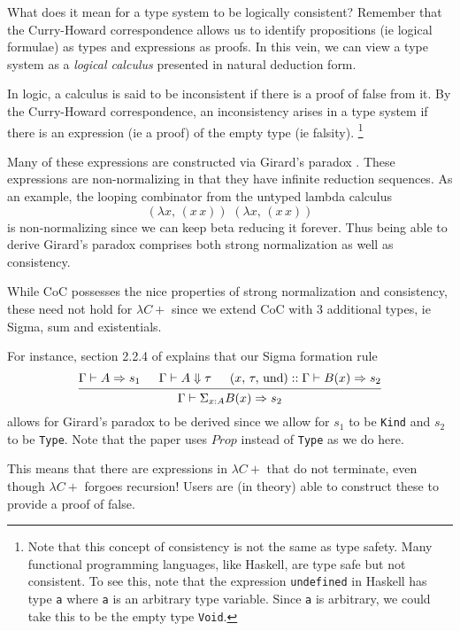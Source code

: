 \documentclass{article}
\begin{document}
What does it mean for a type system to be logically consistent? Remember
that the Curry-Howard correspondence allows us to identify propositions
(ie logical formulae) as types and expressions as proofs.
In this vein, we can view a type system as a \textit{logical calculus}
presented in natural deduction form.

In logic, a calculus is said to be inconsistent if there is a proof of false
from it.
By the Curry-Howard correspondence, an inconsistency arises in a type system if
there is an expression (ie a proof) of the empty type (ie falsity).
\footnote{
  Note that this concept of consistency is not the same as type safety.
  Many functional programming languages, like Haskell, are type safe but not
  consistent.
  To see this, note that the expression \texttt{undefined} in Haskell has type
  \texttt{a} where \texttt{a} is an arbitrary type variable.
  Since \texttt{a} is arbitrary, we could take this to be the empty type
  \texttt{Void}.
}

Many of these expressions are constructed via Girard's paradox
\cite{analysis_of_girard}. 
These expressions are non-normalizing in that they have infinite reduction
sequences.
As an example, the looping combinator from the untyped lambda calculus
 \[ (\lambda x, \, (x \, x)) \,\, (\lambda x, \, (x \, x)) \]
is non-normalizing since we can keep beta reducing it forever.
Thus being able to derive Girard's paradox comprises both strong normalization
as well as consistency.

While CoC possesses the nice properties of strong normalization and
consistency, these need not hold for $\lambda C+$
since we extend CoC with 3 additional types, ie Sigma, sum and existentials.

For instance, section 2.2.4 of \cite{extended_coc} explains that our
Sigma formation rule
 \[
    \begin{prooftree}
      \hypo{\Gamma \vdash A \Rightarrow s_1}
      \hypo{\Gamma \vdash A \Downarrow \tau}
      \hypo{(x, \, \tau, \, \text{und}) :: \Gamma \vdash B(x) \Rightarrow s_2}
      \infer3{\Gamma \vdash \Sigma_{x : A}B(x) \Rightarrow s_2}
    \end{prooftree}
 \]
allows for Girard's paradox to be derived since we allow for $s_1$ to be
\texttt{Kind} and $s_2$ to be \texttt{Type}.
Note that the paper uses $Prop$ instead of \texttt{Type} as we do here.

This means that there are expressions in $\lambda C+$ that do not
terminate, even though $\lambda C+$ forgoes recursion! Users are (in theory)
able to construct these to provide a proof of false.
\end{document}
